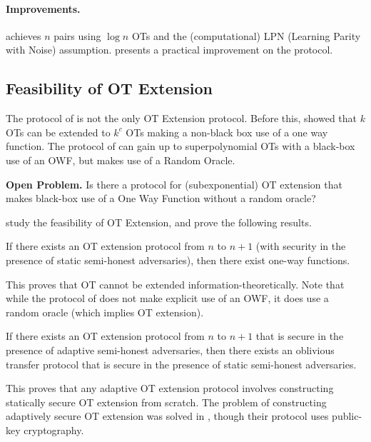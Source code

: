 \paragraph{Improvements.} \cite{vole} achieves $n$ pairs using $\log n$ OTs and the (computational) LPN (Learning Parity with Noise) assumption. \cite{softspokenot} presents a practical improvement on the protocol.

\subsection{Feasibility of OT Extension}

The protocol of \cite{iknp} is not the only OT Extension protocol. Before this, \cite{beaver1996correlated} showed that $k$ OTs can be extended to $k^c$ OTs making a non-black box use of a one way function. The protocol of \cite{iknp} can gain up to superpolynomial OTs with a black-box use of an OWF, but makes use of a Random Oracle.

\textbf{Open Problem.} Is there a protocol for (subexponential) OT extension that makes black-box use of a One Way Function without a random oracle?

\cite{lindell2013feasibility} study the feasibility of OT Extension, and prove the following results.

\begin{theorem}
	\label{otowf}
	If \rarrow there exists an OT extension protocol from $n$ to $n+1$ (with security in the presence of static semi-honest adversaries), then there exist one-way functions.
\end{theorem}

This proves that OT cannot be extended information-theoretically. Note that while the protocol of \cite{iknp} does not make explicit use of an OWF, it does use a random oracle (which implies OT extension).

\begin{theorem}
	If \rarrow there exists an OT extension protocol from $n$ to $n+1$ that is secure in the presence of adaptive semi-honest adversaries, then there exists an oblivious transfer protocol that is secure in the presence of static semi-honest adversaries.
\end{theorem}

This proves that any adaptive OT extension protocol involves constructing statically secure OT extension from scratch. The problem of constructing adaptively secure OT extension was solved in \cite{byali2017fast}, though their protocol uses public-key cryptography.

